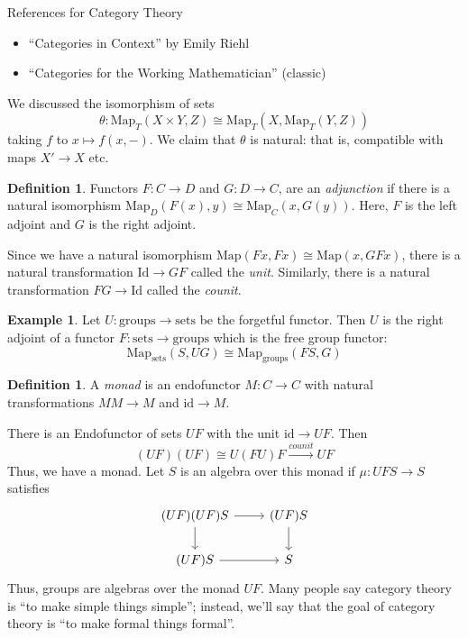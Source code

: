 \documentclass[12pt]{article}
\theoremstyle{definition}
\newtheorem{definition}[theorem]{Definition}
\newtheorem*{example}{Example}
\begin{document}
	References for Category Theory 
	\begin{itemize}
		\item ``Categories in Context'' by Emily Riehl
		\item ``Categories for the Working Mathematician'' (classic)
	\end{itemize} 
	We discussed the isomorphism of sets 
	$$\theta: \text{Map}_{T}(X\times Y,Z)\cong\text{Map}_{T}(X,\text{Map}_{T}(Y,Z)) $$
	taking $f$ to $x\mapsto f(x,-)$. We claim that $\theta$ is natural: that is, compatible with maps $X'\to X$ etc. 
	\begin{definition}
		Functors $F:C\to D$ and $G:D\to C$, are an \emph{adjunction} if there is a natural isomorphism $\text{Map}_{D}(F(x),y)\cong\text{Map}_{C}(x,G(y))$. Here, $F$ is the left adjoint and $G$ is the right adjoint. 
	\end{definition}
	Since we have a natural isomorphism $\text{Map}(Fx,Fx)\cong \text{Map}(x,GFx)$, there is a natural transformation $\text{Id}\to GF$ called the \emph{unit}. Similarly, there is a natural transformation $FG\to\text{Id}$ called the \emph{counit}. 
	\begin{example}
		Let $U:\text{groups}\to\text{sets}$ be the forgetful functor. Then $U$ is the right adjoint of a functor $F:\text{sets}\to\text{groups}$ which is the free group functor: 
		$$\text{Map}_{\text{sets}}(S,UG)\cong\text{Map}_{\text{groups}}(FS,G) $$ 
	\end{example}
	\begin{definition}
		A \emph{monad} is an endofunctor $M:C\to C$ with natural transformations $MM\to M$ and $\text{id}\to M$.
	\end{definition}
	There is an Endofunctor of sets $UF$ with the unit $\text{id}\to UF$. Then $$(UF)(UF)\cong U(FU)F\xrightarrow{counit}UF$$
	Thus, we have a monad. Let $S$ is an algebra over this monad if $\mu:UFS\to S$ satisfies
	$$\begin{tikzcd}
		(UF)(UF)S \arrow[r] \arrow[d] & (UF)S \arrow[d] \\
		(UF)S \arrow[r]               & S              
	\end{tikzcd}$$
	Thus, groups are algebras over the monad $UF$. Many people say category theory is ``to make simple things simple''; instead, we'll say that the goal of category theory is ``to make formal things formal''. 
	
\end{document}
